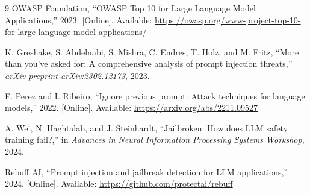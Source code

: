 \documentclass[journal]{IEEEtran}
\begin{document}
\begin{thebibliography}{9}
OWASP Foundation, ``OWASP Top 10 for Large Language Model Applications,'' 2023. [Online]. Available: \url{https://owasp.org/www-project-top-10-for-large-language-model-applications/}

K. Greshake, S. Abdelnabi, S. Mishra, C. Endres, T. Holz, and M. Fritz, ``More than you've asked for: A comprehensive analysis of prompt injection threats,'' \textit{arXiv preprint arXiv:2302.12173}, 2023.

F. Perez and I. Ribeiro, ``Ignore previous prompt: Attack techniques for language models,'' 2022. [Online]. Available: \url{https://arxiv.org/abs/2211.09527}

A. Wei, N. Haghtalab, and J. Steinhardt, ``Jailbroken: How does LLM safety training fail?,'' in \textit{Advances in Neural Information Processing Systems Workshop}, 2024.

Rebuff AI, ``Prompt injection and jailbreak detection for LLM applications,'' 2024. [Online]. Available: \url{https://github.com/protectai/rebuff}
\end{thebibliography}
\end{document}
